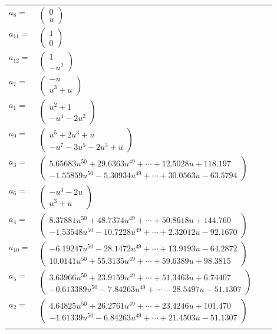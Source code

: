 \documentclass[1p]{elsarticle_modified}
\theoremstyle{definition}
\begin{document}
\begin{tabular}{m{7pt} m{180pt} m{7pt} m{180pt} }
\flushright $a_{8}=$&$\begin{pmatrix}0\\u\end{pmatrix}$ \\
\flushright $a_{11}=$&$\begin{pmatrix}1\\0\end{pmatrix}$ \\
\flushright $a_{12}=$&$\begin{pmatrix}1\\- u^2\end{pmatrix}$ \\
\flushright $a_{7}=$&$\begin{pmatrix}- u\\u^3+u\end{pmatrix}$ \\
\flushright $a_{1}=$&$\begin{pmatrix}u^2+1\\- u^4-2 u^2\end{pmatrix}$ \\
\flushright $a_{9}=$&$\begin{pmatrix}u^5+2 u^3+u\\- u^7-3 u^5-2 u^3+u\end{pmatrix}$ \\
\flushright $a_{3}=$&$\begin{pmatrix}5.65683 u^{50}+29.6363 u^{49}+\cdots+12.5028 u+118.197\\-1.55859 u^{50}-5.30934 u^{49}+\cdots+30.0563 u-63.5794\end{pmatrix}$ \\
\flushright $a_{6}=$&$\begin{pmatrix}- u^3-2 u\\u^3+u\end{pmatrix}$ \\
\flushright $a_{4}=$&$\begin{pmatrix}8.37881 u^{50}+48.7374 u^{49}+\cdots+50.8618 u+144.760\\-1.53548 u^{50}-10.7228 u^{49}+\cdots+2.32012 u-92.1670\end{pmatrix}$ \\
\flushright $a_{10}=$&$\begin{pmatrix}-6.19247 u^{50}-28.1472 u^{49}+\cdots+13.9193 u-64.2872\\10.0141 u^{50}+55.3135 u^{49}+\cdots+59.6389 u+98.3815\end{pmatrix}$ \\
\flushright $a_{5}=$&$\begin{pmatrix}3.63966 u^{50}+23.9159 u^{49}+\cdots+51.3463 u+6.74407\\-0.613389 u^{50}-7.84263 u^{49}+\cdots-28.5497 u-51.1307\end{pmatrix}$ \\
\flushright $a_{2}=$&$\begin{pmatrix}4.64825 u^{50}+26.2761 u^{49}+\cdots+23.4246 u+101.470\\-1.61339 u^{50}-6.84263 u^{49}+\cdots+21.4503 u-51.1307\end{pmatrix}$\\&\end{tabular}
\end{document}
